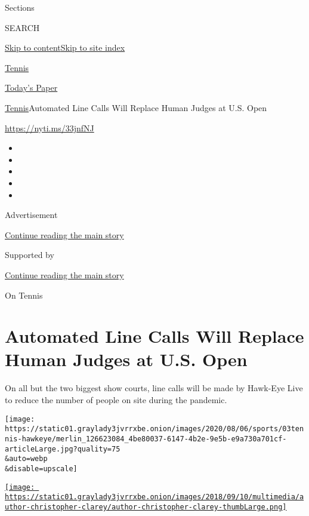 Sections

SEARCH

\protect\hyperlink{site-content}{Skip to
content}\protect\hyperlink{site-index}{Skip to site index}

\href{https://www.nytimes3xbfgragh.onion/section/sports/tennis}{Tennis}

\href{https://myaccount.nytimes3xbfgragh.onion/auth/login?response_type=cookie\&client_id=vi}{}

\href{https://www.nytimes3xbfgragh.onion/section/todayspaper}{Today's
Paper}

\href{/section/sports/tennis}{Tennis}\textbar{}Automated Line Calls Will
Replace Human Judges at U.S. Open

\url{https://nyti.ms/33jnfNJ}

\begin{itemize}
\item
\item
\item
\item
\item
\end{itemize}

Advertisement

\protect\hyperlink{after-top}{Continue reading the main story}

Supported by

\protect\hyperlink{after-sponsor}{Continue reading the main story}

On Tennis

\hypertarget{automated-line-calls-will-replace-human-judges-at-us-open}{%
\section{Automated Line Calls Will Replace Human Judges at U.S.
Open}\label{automated-line-calls-will-replace-human-judges-at-us-open}}

On all but the two biggest show courts, line calls will be made by
Hawk-Eye Live to reduce the number of people on site during the
pandemic.

\texttt{[image: https://static01.graylady3jvrrxbe.onion/images/2020/08/06/sports/03tennis-hawkeye/merlin\_126623084\_4be80037-6147-4b2e-9e5b-e9a730a701cf-articleLarge.jpg?quality=75\\\&auto=webp\\\&disable=upscale]}

\href{https://www.nytimes3xbfgragh.onion/by/christopher-clarey}{\texttt{[image: https://static01.graylady3jvrrxbe.onion/images/2018/09/10/multimedia/author-christopher-clarey/author-christopher-clarey-thumbLarge.png]}}

